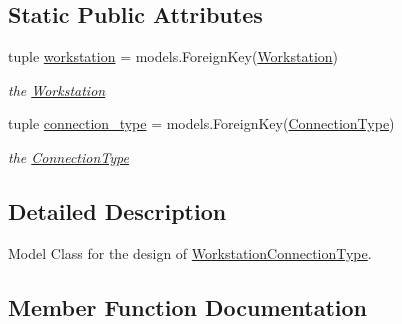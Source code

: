 \subsection*{Static Public Attributes}
\begin{DoxyCompactItemize}
\item 
\hypertarget{classrestriction__system_1_1models_1_1WorkstationConnectionType_af4d85acb7e3cf1ea9db062cb7e3c1143}{}tuple \hyperlink{classrestriction__system_1_1models_1_1WorkstationConnectionType_af4d85acb7e3cf1ea9db062cb7e3c1143}{workstation} = models.\+Foreign\+Key(\hyperlink{classrestriction__system_1_1models_1_1Workstation}{Workstation})\label{classrestriction__system_1_1models_1_1WorkstationConnectionType_af4d85acb7e3cf1ea9db062cb7e3c1143}

\begin{DoxyCompactList}\small\item\em the \hyperlink{classrestriction__system_1_1models_1_1Workstation}{Workstation} \end{DoxyCompactList}\item 
\hypertarget{classrestriction__system_1_1models_1_1WorkstationConnectionType_a91e81903ad08f92dba4165105153af0a}{}tuple \hyperlink{classrestriction__system_1_1models_1_1WorkstationConnectionType_a91e81903ad08f92dba4165105153af0a}{connection\+\_\+type} = models.\+Foreign\+Key(\hyperlink{classrestriction__system_1_1models_1_1ConnectionType}{Connection\+Type})\label{classrestriction__system_1_1models_1_1WorkstationConnectionType_a91e81903ad08f92dba4165105153af0a}

\begin{DoxyCompactList}\small\item\em the \hyperlink{classrestriction__system_1_1models_1_1ConnectionType}{Connection\+Type} \end{DoxyCompactList}\end{DoxyCompactItemize}


\subsection{Detailed Description}
Model Class for the design of \hyperlink{classrestriction__system_1_1models_1_1WorkstationConnectionType}{Workstation\+Connection\+Type}. 

\subsection{Member Function Documentation}
\hypertarget{classrestriction__system_1_1models_1_1WorkstationConnectionType_a7fc9bdcfd47bfde94586e345f65c5e18}{}
